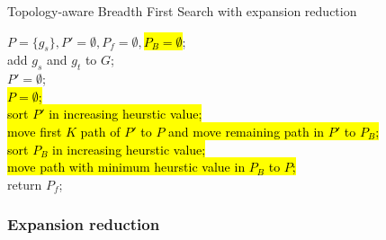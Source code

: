 \documentclass[letterpaper, 10 pt, journal, twoside]{IEEEtran}
\begin{document}
\begin{algorithm}[t] 
 \normalem
\label{a2}
  \caption{Topology-aware Breadth First Search with expansion reduction}
  $P = \{g_s\}, P' = \emptyset, P_f = \emptyset, $\hl{$P_B = \emptyset$}; \\
  add $g_s$ and $g_t$ to $G$; \\
   {
     $P' = \emptyset$; \\
      {
     }
     \hl{$P = \emptyset$;} \\
     \hl{sort $P'$ in increasing heurstic value;} \\
     \hl{move first $K$ path of $P'$ to $P$ and move remaining path in $P'$ to $P_B$;} \\
     \hl{sort $P_B$ in increasing heurstic value;} \\
      {
	   {
	  \hl{move path with minimum heurstic value in $P_B$ to $P$;} \\	  
	  }     
     }		  		  
  } 
  return $P_f$;
\end{algorithm}


\subsubsection{Expansion reduction}  
\end{document}
